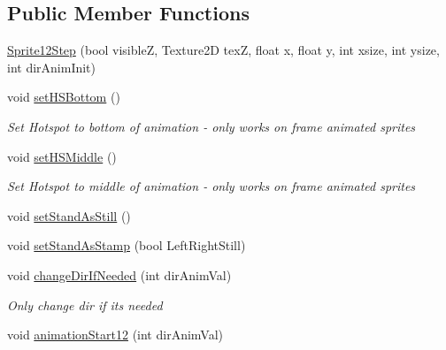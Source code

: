\subsection*{Public Member Functions}
\begin{DoxyCompactItemize}
\item 
\mbox{\hyperlink{class_r_c___framework_1_1_sprite12_step_aed9fb46b122f42a6291527345d7fe390}{Sprite12\+Step}} (bool visibleZ, Texture2D texZ, float x, float y, int xsize, int ysize, int dir\+Anim\+Init)
\item 
void \mbox{\hyperlink{class_r_c___framework_1_1_sprite12_step_acb271325836aa42c56e60f8093eaa207}{set\+H\+S\+Bottom}} ()
\begin{DoxyCompactList}\small\item\em Set Hotspot to bottom of animation -\/ only works on frame animated sprites \end{DoxyCompactList}\item 
void \mbox{\hyperlink{class_r_c___framework_1_1_sprite12_step_a1733812fda63f099381f34d7d9c704fb}{set\+H\+S\+Middle}} ()
\begin{DoxyCompactList}\small\item\em Set Hotspot to middle of animation -\/ only works on frame animated sprites \end{DoxyCompactList}\item 
void \mbox{\hyperlink{class_r_c___framework_1_1_sprite12_step_af628453f3e7fc10e44504edc44867903}{set\+Stand\+As\+Still}} ()
\item 
void \mbox{\hyperlink{class_r_c___framework_1_1_sprite12_step_afe64cd923b9e6dfdd5827321c0b2d134}{set\+Stand\+As\+Stamp}} (bool Left\+Right\+Still)
\item 
void \mbox{\hyperlink{class_r_c___framework_1_1_sprite12_step_a1945fd3391155cdc9a54e3bb626f0053}{change\+Dir\+If\+Needed}} (int dir\+Anim\+Val)
\begin{DoxyCompactList}\small\item\em Only change dir if its needed \end{DoxyCompactList}\item 
void \mbox{\hyperlink{class_r_c___framework_1_1_sprite12_step_a7be59ccd42cc7701d9a8d893f0ba325a}{animation\+Start12}} (int dir\+Anim\+Val)
\end{DoxyCompactItemize}
